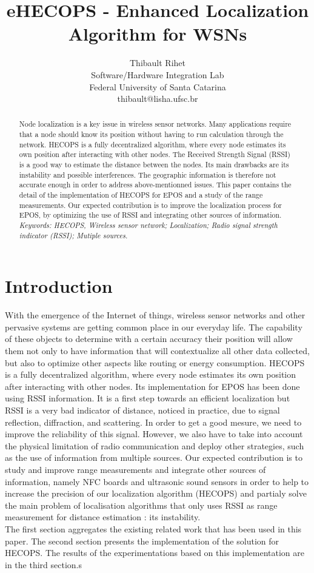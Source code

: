 \documentclass[a4paper,10pt]{article}
\title{eHECOPS - Enhanced Localization Algorithm for WSNs}
\author{ Thibault Rihet\\
Software/Hardware Integration Lab\\
Federal University of Santa Catarina\\
thibault@lisha.ufsc.br}
\begin{document}
\maketitle
\thispagestyle{empty}
\newpage
\tableofcontents
\thispagestyle{empty}
\newpage

\begin{abstract}
Node localization is a key issue in wireless sensor networks. Many applications require that a node should know its position without having to run
calculation through the network. HECOPS is a fully decentralized algorithm, where every node estimates its own position after interacting with other
nodes. The Received Strength Signal (RSSI) is a good way to estimate the distance between the nodes. Its main drawbacks are its instability and
possible interferences. The geographic information is therefore not accurate enough in order to address above-mentionned issues. This paper
contains the detail of the implementation of HECOPS for EPOS and a study of the range measurements. Our expected contribution is to improve the 
localization process for EPOS, by optimizing the use of RSSI and integrating other sources of information. \\
\textit{Keywords: HECOPS, Wireless sensor network; Localization; Radio signal strength indicator (RSSI); Mutiple sources.}
\end{abstract}

\section{Introduction}
With the emergence of the Internet of things, wireless sensor networks and other pervasive systems are getting common place in our everyday life. 
The capability of these objects to determine with a certain accuracy their position will allow them not only to have information that will 
contextualize all other data collected, but also to optimize other aspects like routing or energy consumption. HECOPS is a fully decentralized 
algorithm, where every node estimates its own position after interacting with other nodes. Its implementation for EPOS has been done using RSSI 
information. It is a first step towards an efficient localization but RSSI is a very bad indicator of distance, noticed in practice, due to signal 
reflection, diffraction, and scattering. In order to get a good mesure, we need to improve the reliability of this signal. However, we also have to
take into account the physical limitation of radio communication and deploy other strategies, such as the use of information from multiple sources. 
Our expected contribution is to study and improve range measurements and integrate other sources of information, namely NFC boards and ultrasonic
sound sensors in order to help to increase the precision of our localization algorithm (HECOPS) and partialy solve the main problem of localisation 
algorithms that only uses RSSI as range measurement for distance estimation : its instability. \\
The first section aggregates the existing related work that has been used in this paper. The second section presents the implementation of the
solution for HECOPS. The results of the experimentations based on this implementation are in the third section.s
\end{document}
